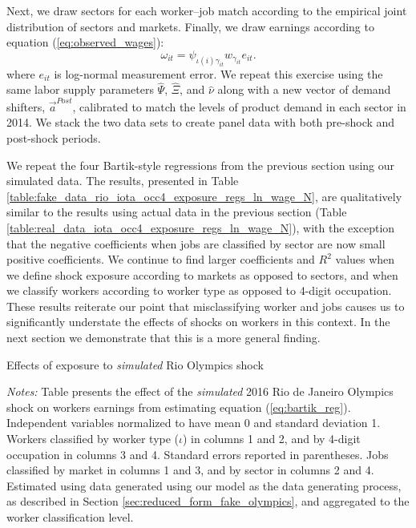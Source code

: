\documentclass[12pt]{article}
\def\g{\gamma}
\def\i{\iota}
\theoremstyle{definition}
\theoremstyle{plain}
\begin{document}
Next, we draw sectors for each worker--job match according to the empirical joint distribution of sectors and markets. Finally, we draw earnings according to equation (\ref{eq:observed_wages}):
\[\omega_{it} = \psi_{\i(i)\g_{it}} w_{\g_{it}} e_{it}. \]
where $e_{it}$ is log-normal measurement error. We repeat this exercise using the same labor supply parameters $\hat \Psi$, $\hat \Xi$, and $\hat \nu$ along with a new vector of demand shifters, $\vec{a}^{Post}$, calibrated to match the levels of product demand in each sector in 2014. We stack the two data sets to create panel data with both pre-shock and post-shock periods. %



We repeat the four Bartik-style regressions from the previous section using our simulated data. The results, presented in Table \ref{table:fake_data_rio_iota_occ4_exposure_regs_ln_wage_N}, are qualitatively similar to the results using actual data in the previous section (Table \ref{table:real_data_iota_occ4_exposure_regs_ln_wage_N}), with the exception that the negative coefficients when jobs are classified by sector are now small positive coefficients. We continue to find larger coefficients and $R^2$ values when we define shock exposure according to markets as opposed to sectors, and when we classify workers according to worker type as opposed to 4-digit occupation. These results reiterate our point that misclassifying worker and jobs causes us to significantly understate the effects of shocks on workers in this context. In the next section we demonstrate that this is a more general finding. 



\begin{table}
	\centering
	\caption{Effects of exposure to \emph{simulated} Rio Olympics shock}
	
	\label{table:fake_data_rio_iota_occ4_exposure_regs_ln_wage_N}
		\footnotesize\flushleft \emph{Notes:} Table presents the effect of the \emph{simulated} 2016 Rio de Janeiro Olympics shock on workers earnings from estimating equation (\ref{eq:bartik_reg}). Independent variables normalized to have mean 0 and standard deviation 1. Workers classified by worker type ($\i$) in columns 1 and 2, and by 4-digit occupation in columns 3 and 4. Standard errors reported in parentheses. Jobs classified by market in columns 1 and 3, and by sector in columns 2 and 4. Estimated using data generated using our model as the data generating process, as described  in Section \ref{sec:reduced_form_fake_olympics}, and aggregated to the worker classification level. 
\end{table}
\end{document}
